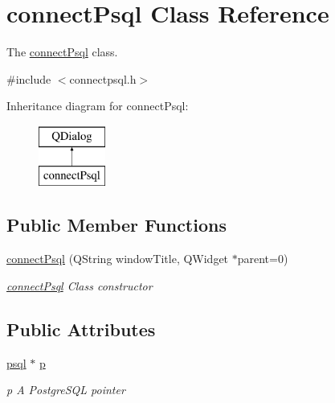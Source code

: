 \hypertarget{classconnect_psql}{}\section{connect\+Psql Class Reference}
\label{classconnect_psql}


The \hyperlink{classconnect_psql}{connect\+Psql} class.  




{\ttfamily \#include $<$connectpsql.\+h$>$}

Inheritance diagram for connect\+Psql\+:\begin{figure}[H]
\begin{center}
\leavevmode
\includegraphics[height=2.000000cm]{classconnect_psql}
\end{center}
\end{figure}
\subsection*{Public Member Functions}
\begin{DoxyCompactItemize}
\item 
\hyperlink{classconnect_psql_aee2b55cd64f5b2fac084eda4e6db0075}{connect\+Psql} (Q\+String window\+Title, Q\+Widget $\ast$parent=0)
\begin{DoxyCompactList}\small\item\em \hyperlink{classconnect_psql}{connect\+Psql} Class constructor \end{DoxyCompactList}\end{DoxyCompactItemize}
\subsection*{Public Attributes}
\begin{DoxyCompactItemize}
\item 
\mbox{\label{classconnect_psql_a5855dbe20b8e699563c0958462236bf2}} 
\hyperlink{classpsql}{psql} $\ast$ \hyperlink{classconnect_psql_a5855dbe20b8e699563c0958462236bf2}{p}
\begin{DoxyCompactList}\small\item\em p A Postgre\+S\+QL pointer \end{DoxyCompactList}\end{DoxyCompactItemize}


